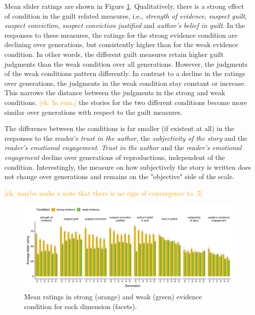 \documentclass[10pt,letterpaper]{article}
\newcommand{\ek}[1]{\textcolor{Orange}{[ek: #1]}}
\begin{document}
Mean slider ratings are shown in Figure \ref{fig:exp2results}. 
Qualitatively, there is a strong effect of condition in the guilt related measures, i.e., \textit{strength of evidence}, \textit{suspect guilt}, \textit{suspect conviction}, \textit{suspect conviction justified} and \textit{author's belief in guilt}. In the responses to these measures, the ratings for the strong evidence condition are declining over generations, but consistently higher than for the weak evidence condition. In other words, the different guilt measures retain higher guilt judgments than the weak condition over all generations. However, the judgments of the weak conditions pattern differently. In contrast to a decline in the ratings over generations, the judgments in the weak condition stay constant or increase. This narrows the distance between the judgments in the strong and weak conditions. \ek{In sum,} the stories for the two different conditions become more similar over generations with respect to the guilt measures.

The difference between the conditions is far smaller (if existent at all) in the responses to the reader's \textit{trust in the author}, the \textit{subjectivity of the story} and the \textit{reader's emotional engagement}. \textit{Trust in the author} and the \textit{reader's emotional engagement} decline over generations of reproductions, independent of the condition. Interestingly, the measure on how subjectively the story is written does not change over generations and remains on the "objective" side of the scale.

\ek{maybe make a note that there is no sign of convergence to .5}

\begin{figure}[]
	\includegraphics[width=\textwidth]{pics/subj_results_byquestion.pdf}
	\caption{Mean ratings in strong (orange) and weak (green) evidence condition for each dimension (facets).} 
	\label{fig:exp2results}
\end{figure}
\end{document}
